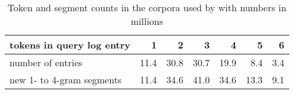 \begin{table}[t]
 \caption{Token and segment counts in the corpora used by \citet{Risvik:2003} with numbers in millions}
 \label{table-token-segments-risvik-2003}
 \centering
 \small
 \begin{tabular}{@{}lrrrrrr@{}}
  \toprule
 tokens in query log entry & 1 & 2 & 3 & 4 & 5 & 6 \\
  \midrule
  number of entries & 11.4 & 30.8 & 30.7 & 19.9 & 8.4 & 3.4  \\
  new 1- to 4-gram segments & 11.4 & 34.6 & 41.0 & 34.6 & 13.3 & 9.1 \\
  \bottomrule
 \end{tabular}
\end{table}
